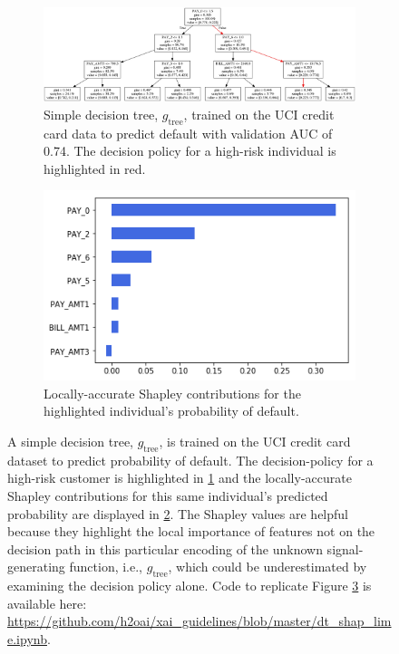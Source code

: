 \documentclass[sigconf]{acmart}
\begin{document}
\begin{figure}[htb!]
	\begin{subfigure}{.55\textwidth}
		\includegraphics[height=.45\linewidth, width=1.15\linewidth]{img/dt.png}
  		\caption{Simple decision tree, $g_{\text{tree}}$, trained on the UCI credit card data to predict default with validation AUC of 0.74. The decision policy for a high-risk individual is highlighted in red.}
  		\label{fig:dt}
	\end{subfigure}\hspace*{40pt}
	\vspace{25pt}\begin{subfigure}{.45\textwidth}
  		\includegraphics[height=.5\linewidth, width=.8\linewidth]{img/shap.png}
		\caption{Locally-accurate Shapley contributions for the\\ highlighted individual's probability of default.}
  		\label{fig:shap}
	\end{subfigure}\vspace{-30pt}
	\caption{A simple decision tree, $g_{\text{tree}}$, is trained on the UCI credit card dataset to predict probability of default. The decision-policy for a high-risk customer is highlighted in \ref{fig:dt} and the locally-accurate Shapley contributions for this same individual's predicted probability are displayed in \ref{fig:shap}. The Shapley values are helpful because they highlight the local importance of features not on the decision path in this particular encoding of the unknown signal-generating function, i.e., $g_{\text{tree}}$, which could be underestimated by examining the decision policy alone. Code to replicate Figure \ref{fig:dt_shap} is available here: \url{https://github.com/h2oai/xai_guidelines/blob/master/dt_shap_lime.ipynb}.} 
	\label{fig:dt_shap}
\end{figure}
\end{document}

